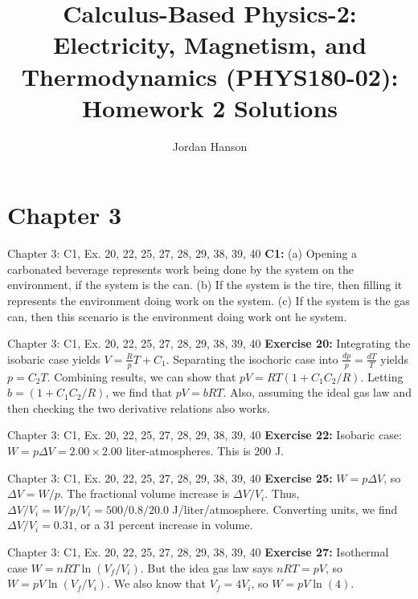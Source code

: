 \documentclass{beamer}
\title{Calculus-Based Physics-2: Electricity, Magnetism, and Thermodynamics (PHYS180-02): Homework 2 Solutions}
\author{Jordan Hanson}
\institute{Whittier College Department of Physics and Astronomy}
\begin{document}
\maketitle

\section{Chapter 3}

\begin{frame}{Chapter 3: C1, Ex. 20, 22, 25, 27, 28, 29, 38, 39, 40}
\textbf{C1:} (a) Opening a carbonated beverage represents work being done by the system on the environment, if the system is the can. (b) If the system is the tire, then filling it represents the environment doing work on the system. (c) If the system is the gas can, then this scenario is the environment doing work ont he system.
\end{frame}

\begin{frame}{Chapter 3: C1, Ex. 20, 22, 25, 27, 28, 29, 38, 39, 40}
\textbf{Exercise 20:} Integrating the isobaric case yields $V = \frac{R}{p}T+C_1$.  Separating the isochoric case into $\frac{dp}{p} = \frac{dT}{T}$ yields $p = C_2 T$.  Combining results, we can show that $pV = RT(1+C_1 C_2 / R)$.  Letting $b = (1+C_1 C_2 / R)$, we find that $pV = bRT$.  Also, assuming the ideal gas law and then checking the two derivative relations also works.
\end{frame}

\begin{frame}{Chapter 3: C1, Ex. 20, 22, 25, 27, 28, 29, 38, 39, 40}
\textbf{Exercise 22:} Isobaric case: $W = p\Delta V = 2.00 \times 2.00$ liter-atmospheres.  This is 200 J.
\end{frame}

\begin{frame}{Chapter 3: C1, Ex. 20, 22, 25, 27, 28, 29, 38, 39, 40}
\textbf{Exercise 25:} $W = p \Delta V$, so $\Delta V = W/p$.  The fractional volume increase is $\Delta V/V_i$.  Thus, $\Delta V/V_i = W/p/V_i = 500/0.8/20.0$ J/liter/atmosphere.  Converting units, we find $\Delta V/V_i = 0.31$, or a 31 percent increase in volume.
\end{frame}

\begin{frame}{Chapter 3: C1, Ex. 20, 22, 25, 27, 28, 29, 38, 39, 40}
\textbf{Exercise 27:} Isothermal case $W = nRT\ln(V_f/V_i)$. But the idea gas law says $nRT = pV$, so $W = pV\ln(V_f/V_i)$.  We also know that $V_f = 4 V_i$, so $W = pV \ln(4)$.
\end{frame}
\end{document}
